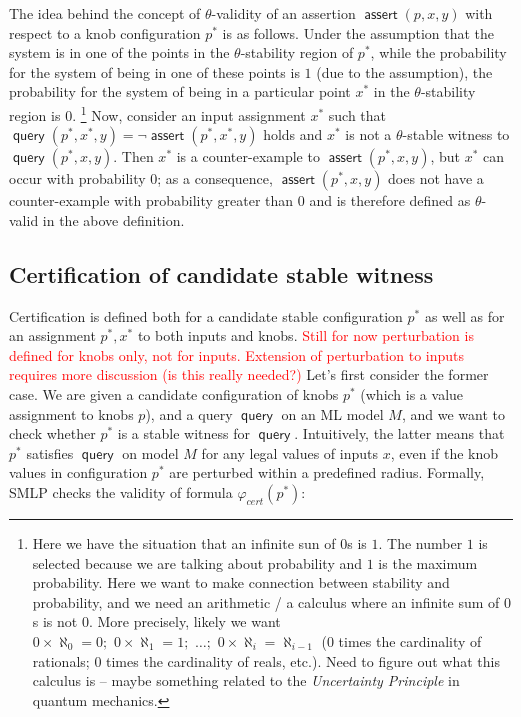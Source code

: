 \documentclass[a4paper,parskip=half]{article} %
\newcommand*\eqdef=
\newcommand*\query{\operatorname{\mathsf{query}}}
\newcommand*\assert{\operatorname{\mathsf{assert}}}
\newcommand\todozk[1]{\textcolor{red}{#1}}
\newcommand*\ZK{\todozk}
\begin{document}
The idea behind the concept of $\theta$-validity of an assertion $\assert(p, x,y)$ with respect to a knob configuration $p^*$ is as follows. 
Under the assumption that the system is 
in one of the points in the $\theta$-stability region of $p^*$,  while the probability for the system of being in one of these points is $1$ 
(due to the assumption), the probability for the system of being in a particular point $x^*$ in the $\theta$-stability region is $0$.
\footnote{Here we have the situation that an infinite sun of $0$s is $1$. The number $1$ is selected because we are talking 
about probability and $1$ is the maximum probability. Here we want to make connection between stability and probability,
and we need an arithmetic / a calculus where an infinite sum of $0$s is not $0$. More precisely, likely we want $0 \times \aleph_0 = 0;\,\,
0 \times \aleph_1 = 1; \,\, \ldots ; \,\, 0 \times \aleph_i =  \aleph_{i-1} $ ($0$ times the cardinality of rationals;
 $0$ times the cardinality of reals, etc.).  Need to figure out what this calculus 
is -- maybe something related to the \emph{Uncertainty Principle} in quantum mechanics.} 
Now, consider  an input assignment $x^*$ such that $\query(p^*, x^*,y) \eqdef \neg \assert(p^*, x^*,y)$  holds and $x^*$ is not
a  $\theta$-stable witness to $\query(p^*,x,y)$. Then $x^*$ is a counter-example to $\assert(p^*, x, y)$, but $x^*$ can occur with probability $0$; 
as a consequence, $\assert(p^*, x, y)$ does not have a counter-example with probability greater than $0$ and is therefore defined 
as $\theta$-valid in the above definition.




\subsection{Certification of candidate stable witness}\label{sect:certify}



Certification is defined both for a candidate stable configuration $p^*$ as well as for an assignment $p^*, x^*$ to both inputs and knobs.
\ZK{Still for now perturbation is defined for knobs only, not for inputs. Extension of perturbation to inputs requires more discussion (is this really needed?)}
Let's first consider the former case.
We are given a candidate configuration of knobs $p^*$ (which is a value assignment to knobs $p$), and a query $\query$ on an 
ML model $M$, and we want to check whether $p^*$ is a stable witness for $\query$. Intuitively, the latter means that $p^*$
satisfies $\query$ on model $M$ for any legal values of inputs $x$, even if the knob values in configuration $p^*$ are perturbed 
within a predefined radius. Formally, SMLP checks the validity of formula $\varphi_{\mathit{cert}}(p^*)$: 
\end{document}
